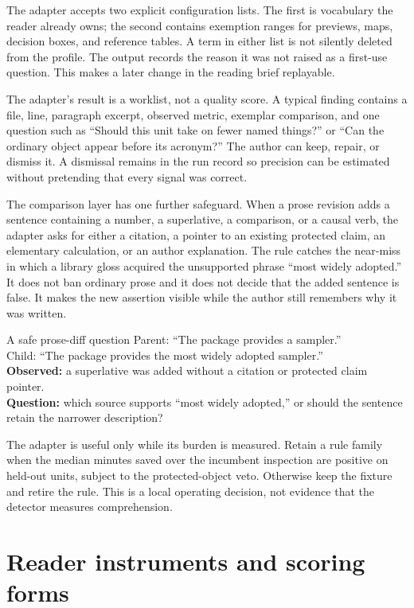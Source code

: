 The adapter accepts two explicit configuration lists. The first is vocabulary
the reader already owns; the second contains exemption ranges for previews,
maps, decision boxes, and reference tables. A term in either list is not
silently deleted from the profile. The output records the reason it was not
raised as a first-use question. This makes a later change in the reading brief
replayable.

The adapter's result is a worklist, not a quality score. A typical finding
contains a file, line, paragraph excerpt, observed metric, exemplar comparison,
and one question such as ``Should this unit take on fewer named things?'' or
``Can the ordinary object appear before its acronym?'' The author can keep,
repair, or dismiss it. A dismissal remains in the run record so precision can
be estimated without pretending that every signal was correct.

The comparison layer has one further safeguard. When a prose revision adds a
sentence containing a number, a superlative, a comparison, or a causal verb,
the adapter asks for either a citation, a pointer to an existing protected
claim, an elementary calculation, or an author explanation. The rule catches
the near-miss in which a library gloss acquired the unsupported phrase ``most
widely adopted.'' It does not ban ordinary prose and it does not decide that
the added sentence is false. It makes the new assertion visible while the
author still remembers why it was written.

\begin{cardexample}{A safe prose-diff question}
Parent: ``The package provides a sampler.''\\
Child: ``The package provides the most widely adopted sampler.''\\
\textbf{Observed:} a superlative was added without a citation or protected
claim pointer.\\
\textbf{Question:} which source supports ``most widely adopted,'' or should
the sentence retain the narrower description?
\end{cardexample}

The adapter is useful only while its burden is measured. Retain a rule family
when the median minutes saved over the incumbent inspection are positive on
held-out units, subject to the protected-object veto. Otherwise keep the
fixture and retire the rule. This is a local operating decision, not evidence
that the detector measures comprehension.

\section{Reader instruments and scoring forms}
\label{app:reader-instruments}

